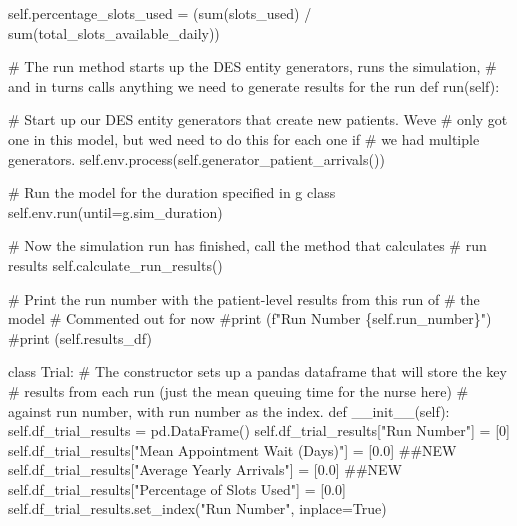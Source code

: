 \documentclass[
  letterpaper,
  DIV=11,
  numbers=noendperiod]{scrreprt}
\newenvironment{Shaded}{\begin{snugshade}}{\end{snugshade}}
\newcommand{\BuiltInTok}[1]{\textcolor[rgb]{0.00,0.23,0.31}{#1}}
\newcommand{\CommentTok}[1]{\textcolor[rgb]{0.37,0.37,0.37}{#1}}
\newcommand{\DecValTok}[1]{\textcolor[rgb]{0.68,0.00,0.00}{#1}}
\newcommand{\FloatTok}[1]{\textcolor[rgb]{0.68,0.00,0.00}{#1}}
\newcommand{\FunctionTok}[1]{\textcolor[rgb]{0.28,0.35,0.67}{#1}}
\newcommand{\KeywordTok}[1]{\textcolor[rgb]{0.00,0.23,0.31}{#1}}
\newcommand{\NormalTok}[1]{\textcolor[rgb]{0.00,0.23,0.31}{#1}}
\newcommand{\OperatorTok}[1]{\textcolor[rgb]{0.37,0.37,0.37}{#1}}
\newcommand{\StringTok}[1]{\textcolor[rgb]{0.13,0.47,0.30}{#1}}
\newcommand{\VariableTok}[1]{\textcolor[rgb]{0.07,0.07,0.07}{#1}}
\begin{document}
\begin{Shaded}
\begin{Highlighting}[]
        \VariableTok{self}\NormalTok{.percentage\_slots\_used }\OperatorTok{=}\NormalTok{ (}\BuiltInTok{sum}\NormalTok{(slots\_used) }\OperatorTok{/} \BuiltInTok{sum}\NormalTok{(total\_slots\_available\_daily))}

    \CommentTok{\# The run method starts up the DES entity generators, runs the simulation,}
    \CommentTok{\# and in turns calls anything we need to generate results for the run}
    \KeywordTok{def}\NormalTok{ run(}\VariableTok{self}\NormalTok{):}

        \CommentTok{\# Start up our DES entity generators that create new patients.  We\textquotesingle{}ve}
        \CommentTok{\# only got one in this model, but we\textquotesingle{}d need to do this for each one if}
        \CommentTok{\# we had multiple generators.}
        \VariableTok{self}\NormalTok{.env.process(}\VariableTok{self}\NormalTok{.generator\_patient\_arrivals())}

        \CommentTok{\# Run the model for the duration specified in g class}
        \VariableTok{self}\NormalTok{.env.run(until}\OperatorTok{=}\NormalTok{g.sim\_duration)}

        \CommentTok{\# Now the simulation run has finished, call the method that calculates}
        \CommentTok{\# run results}
        \VariableTok{self}\NormalTok{.calculate\_run\_results()}

        \CommentTok{\# Print the run number with the patient{-}level results from this run of}
        \CommentTok{\# the model}
        \CommentTok{\# Commented out for now}
        \CommentTok{\#print (f"Run Number \{self.run\_number\}")}
        \CommentTok{\#print (self.results\_df)}

\KeywordTok{class}\NormalTok{ Trial:}
    \CommentTok{\# The constructor sets up a pandas dataframe that will store the key}
    \CommentTok{\# results from each run (just the mean queuing time for the nurse here)}
    \CommentTok{\# against run number, with run number as the index.}
    \KeywordTok{def}  \FunctionTok{\_\_init\_\_}\NormalTok{(}\VariableTok{self}\NormalTok{):}
        \VariableTok{self}\NormalTok{.df\_trial\_results }\OperatorTok{=}\NormalTok{ pd.DataFrame()}
        \VariableTok{self}\NormalTok{.df\_trial\_results[}\StringTok{"Run Number"}\NormalTok{] }\OperatorTok{=}\NormalTok{ [}\DecValTok{0}\NormalTok{]}
        \VariableTok{self}\NormalTok{.df\_trial\_results[}\StringTok{"Mean Appointment Wait (Days)"}\NormalTok{] }\OperatorTok{=}\NormalTok{ [}\FloatTok{0.0}\NormalTok{] }\CommentTok{\#\#NEW}
        \VariableTok{self}\NormalTok{.df\_trial\_results[}\StringTok{"Average Yearly Arrivals"}\NormalTok{] }\OperatorTok{=}\NormalTok{ [}\FloatTok{0.0}\NormalTok{] }\CommentTok{\#\#NEW}
        \VariableTok{self}\NormalTok{.df\_trial\_results[}\StringTok{"Percentage of Slots Used"}\NormalTok{] }\OperatorTok{=}\NormalTok{ [}\FloatTok{0.0}\NormalTok{]}
        \VariableTok{self}\NormalTok{.df\_trial\_results.set\_index(}\StringTok{"Run Number"}\NormalTok{, inplace}\OperatorTok{=}\VariableTok{True}\NormalTok{)}


\end{Highlighting}
\end{Shaded}
\end{document}
